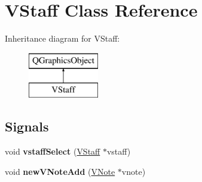 \hypertarget{class_v_staff}{}\section{V\+Staff Class Reference}
\label{class_v_staff}
Inheritance diagram for V\+Staff\+:\begin{figure}[H]
\begin{center}
\leavevmode
\includegraphics[height=2.000000cm]{class_v_staff}
\end{center}
\end{figure}
\subsection*{Signals}
\begin{DoxyCompactItemize}
\item 
\hypertarget{class_v_staff_a79cbbcba090397f001af49c89516d88e}{}void {\bfseries vstaff\+Select} (\hyperlink{class_v_staff}{V\+Staff} $\ast$vstaff)\label{class_v_staff_a79cbbcba090397f001af49c89516d88e}

\item 
\hypertarget{class_v_staff_a7cb560594badc35f609ed4dc183ab030}{}void {\bfseries new\+V\+Note\+Add} (\hyperlink{class_v_note}{V\+Note} $\ast$vnote)\label{class_v_staff_a7cb560594badc35f609ed4dc183ab030}

\end{DoxyCompactItemize}
